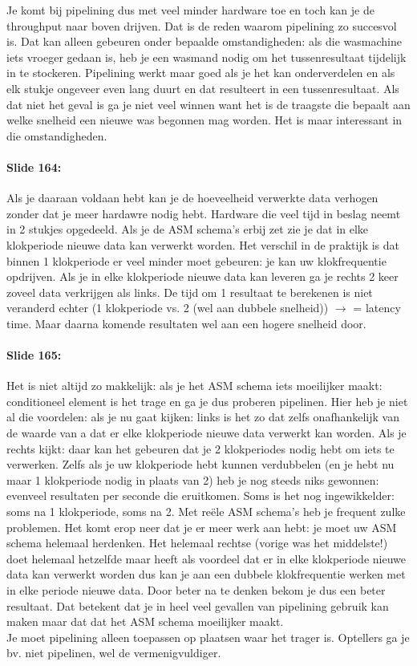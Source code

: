 \documentclass[10pt,a4paper]{book}
\begin{document}
Je komt bij pipelining dus met veel minder hardware toe en toch kan je de throughput naar boven drijven. Dat is de reden waarom pipelining zo succesvol is. Dat kan alleen gebeuren onder bepaalde omstandigheden: als die wasmachine iets vroeger gedaan is, heb je een wasmand nodig om het tussenresultaat tijdelijk in te stockeren. Pipelining werkt maar goed als je het kan onderverdelen en als elk stukje ongeveer even lang duurt en dat resulteert in een tussenresultaat. Als dat niet het geval is ga je niet veel winnen want het is de traagste die bepaalt aan welke snelheid een nieuwe was begonnen mag worden. Het is maar interessant in die omstandigheden.

\paragraph{Slide 164:} Als je daaraan voldaan hebt kan je de hoeveelheid verwerkte data verhogen zonder dat je meer hardawre nodig hebt. Hardware die veel tijd in beslag neemt in 2 stukjes opgedeeld. Als je de ASM schema's erbij zet zie je dat in elke klokperiode nieuwe data kan verwerkt worden. Het verschil in de praktijk is dat binnen 1 klokperiode er veel minder moet gebeuren: je kan uw klokfrequentie opdrijven. Als je in elke klokperiode nieuwe data kan leveren ga je rechts 2 keer zoveel data verkrijgen als links. De tijd om 1 resultaat te berekenen is niet veranderd echter (1 klokperiode vs. 2 (wel aan dubbele snelheid)) $\rightarrow$ = latency time. Maar daarna komende resultaten wel aan een hogere snelheid door. 

\paragraph{Slide 165:} Het is niet altijd zo makkelijk: als je het ASM schema iets moeilijker maakt: conditioneel element is het trage en ga je dus proberen pipelinen. Hier heb je niet al die voordelen: als je nu gaat kijken: links is het zo dat zelfs onafhankelijk van de waarde van a dat er elke klokperiode nieuwe data verwerkt kan worden. Als je rechts kijkt: daar kan het gebeuren dat je 2 klokperiodes nodig hebt om iets te verwerken. Zelfs als je uw klokperiode hebt kunnen verdubbelen (en je hebt nu maar 1 klokperiode nodig in plaats van 2) heb je nog steeds niks gewonnen: evenveel resultaten per seconde die eruitkomen. Soms is het nog ingewikkelder: soms na 1 klokperiode, soms na 2. Met re\"ele ASM schema's heb je frequent zulke problemen. Het komt erop neer dat je er meer werk aan hebt: je moet uw ASM schema helemaal herdenken. Het helemaal rechtse (vorige was het middelste!) doet helemaal hetzelfde maar heeft als voordeel dat er in elke klokperiode nieuwe data kan verwerkt worden dus kan je aan een dubbele klokfrequentie werken met in elke periode nieuwe data. Door beter na te denken bekom je dus een beter resultaat. Dat betekent dat je in heel veel gevallen van pipelining gebruik kan maken maar dat dat het ASM schema moeilijker maakt.\\
Je moet pipelining alleen toepassen op plaatsen waar het trager is. Optellers ga je bv. niet pipelinen, wel de vermenigvuldiger. 
\end{document}

